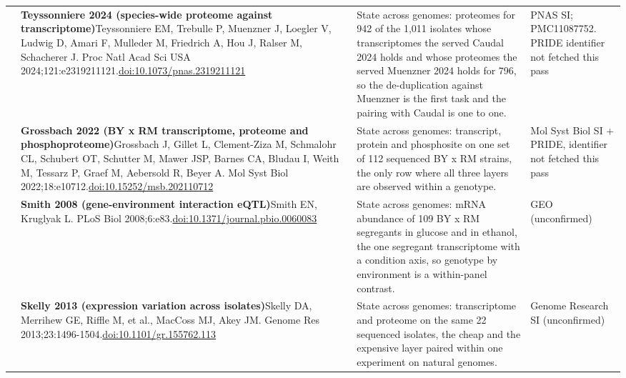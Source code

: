 \begin{landscape}
\begin{longtable}{@{}r@{\hspace{4pt}} L{86mm} L{92mm} L{62mm}@{}}
 & \textbf{Teyssonniere 2024 (species-wide proteome against transcriptome)}\newline Teyssonniere EM, Trebulle P, Muenzner J, Loegler V, Ludwig D, Amari F, Mulleder M, Friedrich A, Hou J, Ralser M, Schacherer J. Proc Natl Acad Sci USA 2024;121:e2319211121.\newline \href{https://doi.org/10.1073/pnas.2319211121}{doi:10.1073/\allowbreak pnas.2319211121} & State across genomes: proteomes for 942 of the 1,011 isolates whose transcriptomes the served Caudal 2024 holds and whose proteomes the served Muenzner 2024 holds for 796, so the de-duplication against Muenzner is the first task and the pairing with Caudal is one to one. & PNAS SI; PMC11087752. PRIDE identifier not fetched this pass \\
 & \textbf{Grossbach 2022 (BY x RM transcriptome, proteome and phosphoproteome)}\newline Grossbach J, Gillet L, Clement-Ziza M, Schmalohr CL, Schubert OT, Schutter M, Mawer JSP, Barnes CA, Bludau I, Weith M, Tessarz P, Graef M, Aebersold R, Beyer A. Mol Syst Biol 2022;18:e10712.\newline \href{https://doi.org/10.15252/msb.202110712}{doi:10.15252/\allowbreak msb.202110712} & State across genomes: transcript, protein and phosphosite on one set of 112 sequenced BY x RM strains, the only row where all three layers are observed within a genotype. & Mol Syst Biol SI + PRIDE, identifier not fetched this pass \\
 & \textbf{Smith 2008 (gene-environment interaction eQTL)}\newline Smith EN, Kruglyak L. PLoS Biol 2008;6:e83.\newline \href{https://doi.org/10.1371/journal.pbio.0060083}{doi:10.1371/\allowbreak journal.pbio.0060083} & State across genomes: mRNA abundance of 109 BY x RM segregants in glucose and in ethanol, the one segregant transcriptome with a condition axis, so genotype by environment is a within-panel contrast. & GEO (unconfirmed) \\
 & \textbf{Skelly 2013 (expression variation across isolates)}\newline Skelly DA, Merrihew GE, Riffle M, et al., MacCoss MJ, Akey JM. Genome Res 2013;23:1496-1504.\newline \href{https://doi.org/10.1101/gr.155762.113}{doi:10.1101/\allowbreak gr.155762.113} & State across genomes: transcriptome and proteome on the same 22 sequenced isolates, the cheap and the expensive layer paired within one experiment on natural genomes. & Genome Research SI (unconfirmed) \\

\end{longtable}
\end{landscape}
